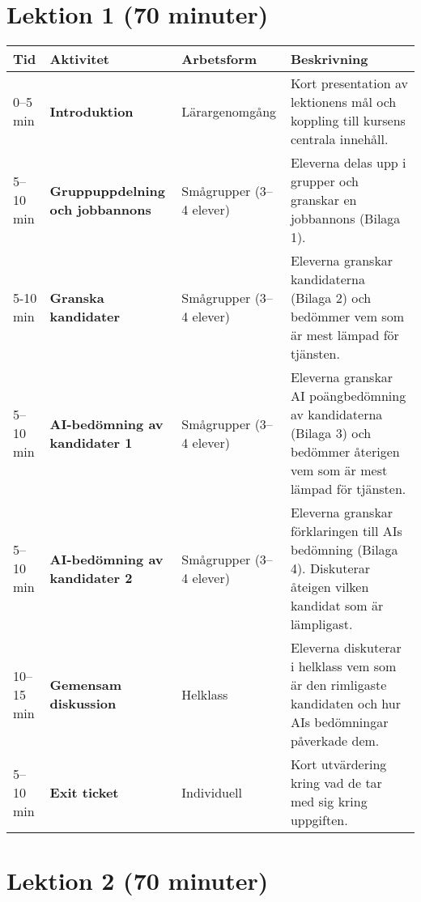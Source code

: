 \documentclass[12pt]{article}
\begin{document}
\break

\section*{Lektion 1 (70 minuter)}

\renewcommand{\arraystretch}{1.3} %

\begin{table}[h!]
\centering
\begin{tabularx}{\textwidth}{|p{2cm}|p{4cm}|p{3cm}|X|}
\hline
\rowcolor{gray!20} \textbf{Tid} & \textbf{Aktivitet} & \textbf{Arbetsform} & \textbf{Beskrivning} \\
\hline
0--5 min & \textbf{Introduktion} & Lärargenomgång &Kort presentation av lektionens mål och koppling till kursens centrala innehåll.  \\
\hline
\rowcolor{gray!10} 5--10 min & \textbf{Gruppuppdelning och jobbannons} & Smågrupper (3--4 elever) & Eleverna delas upp i grupper och granskar en jobbannons (Bilaga 1). \\
\hline
5-10 min & \textbf{Granska kandidater} & Smågrupper (3--4 elever) & Eleverna granskar kandidaterna (Bilaga 2) och bedömmer vem som är mest lämpad för tjänsten. \\
\hline
\rowcolor{gray!10} 5--10 min & \textbf{AI-bedömning av kandidater 1} & Smågrupper (3--4 elever) & Eleverna granskar AI poängbedömning av kandidaterna (Bilaga 3) och bedömmer återigen vem som är mest lämpad för tjänsten. \\
\hline
5--10 min & \textbf{AI-bedömning av kandidater 2} & Smågrupper (3--4 elever) & Eleverna granskar förklaringen till AIs bedömning (Bilaga 4). Diskuterar åteigen vilken kandidat som är lämpligast. \\
\hline
\rowcolor{gray!10} 10--15 min & \textbf{Gemensam diskussion} & Helklass & Eleverna diskuterar i helklass vem som är den rimligaste kandidaten och hur AIs bedömningar påverkade dem. \\
\hline
5--10 min & \textbf{Exit ticket} & Individuell & Kort utvärdering kring vad de tar med sig kring uppgiften. \\
\hline
\end{tabularx}
\end{table}
\break

\section*{Lektion 2 (70 minuter)}
\end{document}
